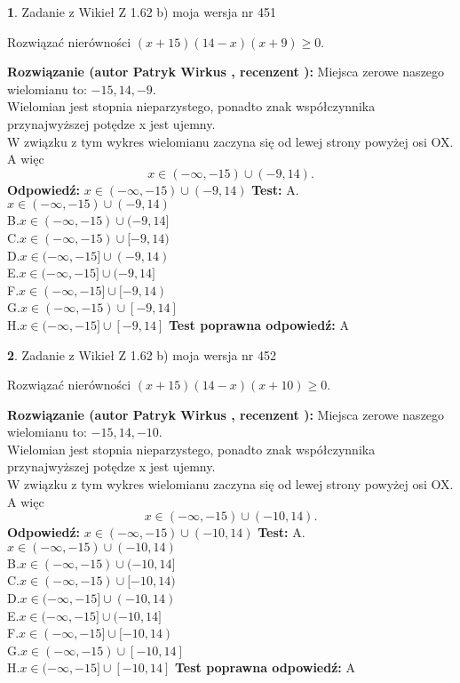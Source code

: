\documentclass[12pt, a4paper]{article}
\theoremstyle{definition} %
\newtheorem{zad}{}
\newcommand{\zadStart}[1]{\begin{zad}#1\newline}
\newcommand{\zadStop}{\end{zad}}
\newcommand{\rozwStart}[2]{\noindent \textbf{Rozwiązanie (autor #1 , recenzent #2): }\newline}
\newcommand{\rozwStop}{\newline}
\newcommand{\odpStart}{\noindent \textbf{Odpowiedź:}\newline}
\newcommand{\odpStop}{\newline}
\newcommand{\testStart}{\noindent \textbf{Test:}\newline}
\newcommand{\testStop}{\newline}
\newcommand{\kluczStart}{\noindent \textbf{Test poprawna odpowiedź:}\newline}
\newcommand{\kluczStop}{\newline}
\begin{document}
\zadStart{Zadanie z Wikieł Z 1.62 b) moja wersja nr 451}

Rozwiązać nierówności $(x+15)(14-x)(x+9)\ge0$.
\zadStop
\rozwStart{Patryk Wirkus}{}
Miejsca zerowe naszego wielomianu to: $-15, 14, -9$.\\
Wielomian jest stopnia nieparzystego, ponadto znak współczynnika przy\linebreak najwyższej potędze x jest ujemny.\\ W związku z tym wykres wielomianu zaczyna się od lewej strony powyżej osi OX. A więc $$x \in (-\infty,-15) \cup (-9,14).$$
\rozwStop
\odpStart
$x \in (-\infty,-15) \cup (-9,14)$
\odpStop
\testStart
A.$x \in (-\infty,-15) \cup (-9,14)$\\
B.$x \in (-\infty,-15) \cup (-9,14]$\\
C.$x \in (-\infty,-15) \cup [-9,14)$\\
D.$x \in (-\infty,-15] \cup (-9,14)$\\
E.$x \in (-\infty,-15] \cup (-9,14]$\\
F.$x \in (-\infty,-15] \cup [-9,14)$\\
G.$x \in (-\infty,-15) \cup [-9,14]$\\
H.$x \in (-\infty,-15] \cup [-9,14]$
\testStop
\kluczStart
A
\kluczStop



\zadStart{Zadanie z Wikieł Z 1.62 b) moja wersja nr 452}

Rozwiązać nierówności $(x+15)(14-x)(x+10)\ge0$.
\zadStop
\rozwStart{Patryk Wirkus}{}
Miejsca zerowe naszego wielomianu to: $-15, 14, -10$.\\
Wielomian jest stopnia nieparzystego, ponadto znak współczynnika przy\linebreak najwyższej potędze x jest ujemny.\\ W związku z tym wykres wielomianu zaczyna się od lewej strony powyżej osi OX. A więc $$x \in (-\infty,-15) \cup (-10,14).$$
\rozwStop
\odpStart
$x \in (-\infty,-15) \cup (-10,14)$
\odpStop
\testStart
A.$x \in (-\infty,-15) \cup (-10,14)$\\
B.$x \in (-\infty,-15) \cup (-10,14]$\\
C.$x \in (-\infty,-15) \cup [-10,14)$\\
D.$x \in (-\infty,-15] \cup (-10,14)$\\
E.$x \in (-\infty,-15] \cup (-10,14]$\\
F.$x \in (-\infty,-15] \cup [-10,14)$\\
G.$x \in (-\infty,-15) \cup [-10,14]$\\
H.$x \in (-\infty,-15] \cup [-10,14]$
\testStop
\kluczStart
A
\kluczStop
\end{document}
